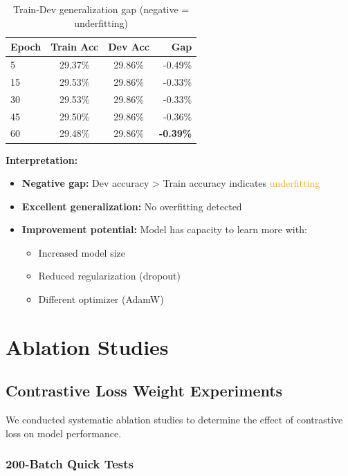 \documentclass[12pt,a4paper]{article}
\begin{document}
\begin{table}[H]
\centering
\begin{tabular}{lccr}
\toprule
\textbf{Epoch} & \textbf{Train Acc} & \textbf{Dev Acc} & \textbf{Gap} \\
\midrule
5 & 29.37\% & 29.86\% & -0.49\% \\
15 & 29.53\% & 29.86\% & -0.33\% \\
30 & 29.53\% & 29.86\% & -0.33\% \\
45 & 29.50\% & 29.86\% & -0.36\% \\
60 & 29.48\% & 29.86\% & \textbf{-0.39\%} \\
\bottomrule
\end{tabular}
\caption{Train-Dev generalization gap (negative = underfitting)}
\end{table}

\textbf{Interpretation:}
\begin{itemize}
    \item \textbf{Negative gap:} Dev accuracy > Train accuracy indicates \textcolor{orange}{underfitting}
    \item \textbf{Excellent generalization:} No overfitting detected
    \item \textbf{Improvement potential:} Model has capacity to learn more with:
    \begin{itemize}
        \item Increased model size
        \item Reduced regularization (dropout)
        \item Different optimizer (AdamW)
    \end{itemize}
\end{itemize}

\section{Ablation Studies}

\subsection{Contrastive Loss Weight Experiments}

We conducted systematic ablation studies to determine the effect of contrastive loss on model performance.

\subsubsection{200-Batch Quick Tests}
\end{document}
